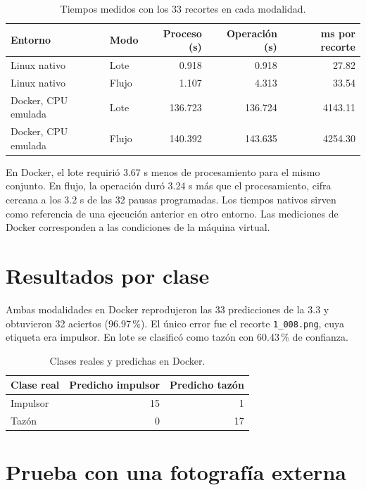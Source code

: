 \documentclass[11pt,letterpaper]{article}
\begin{document}
\begin{table}[htbp]
\centering
\small
\caption{Tiempos medidos con los 33 recortes en cada modalidad.}
\begin{tabular}{@{}llrrr@{}}
\toprule
\textbf{Entorno} & \textbf{Modo} & \textbf{Proceso (s)} & \textbf{Operación (s)} & \textbf{ms por recorte} \\
\midrule
Linux nativo & Lote  & 0.918   & 0.918   & 27.82 \\
Linux nativo & Flujo & 1.107   & 4.313   & 33.54 \\
Docker, CPU emulada & Lote  & 136.723 & 136.724 & 4143.11 \\
Docker, CPU emulada & Flujo & 140.392 & 143.635 & 4254.30 \\
\bottomrule
\end{tabular}
\end{table}

En Docker, el lote requirió 3.67 s menos de procesamiento para el mismo conjunto. En flujo, la operación duró 3.24 s más que el procesamiento, cifra cercana a los 3.2 s de las 32 pausas programadas. Los tiempos nativos sirven como referencia de una ejecución anterior en otro entorno. Las mediciones de Docker corresponden a las condiciones de la máquina virtual.

\section*{Resultados por clase}

Ambas modalidades en Docker reprodujeron las 33 predicciones de la 3.3 y obtuvieron 32 aciertos (96.97\,\%). El único error fue el recorte \texttt{1\_008.png}, cuya etiqueta era impulsor. En lote se clasificó como tazón con 60.43\,\% de confianza.

\begin{table}[htbp]
\centering
\small
\caption{Clases reales y predichas en Docker.}
\begin{tabular}{@{}lrr@{}}
\toprule
\textbf{Clase real} & \textbf{Predicho impulsor} & \textbf{Predicho tazón} \\
\midrule
Impulsor & 15 & 1 \\
Tazón    & 0  & 17 \\
\bottomrule
\end{tabular}
\end{table}

\clearpage
\section*{Prueba con una fotografía externa}
\end{document}
